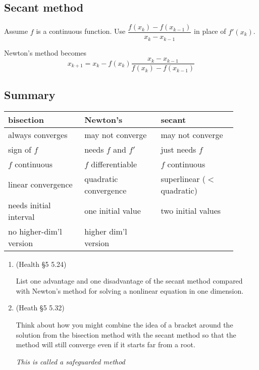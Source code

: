 \documentclass[12pt,letterpaper,noanswers]{exam}
\begin{document}
\subsection*{Secant method}
\begin{tcolorbox}
Assume $f$ is a continuous function.  Use $\dfrac{f(x_k)-f(x_{k-1})}{x_k-x_{k-1}}$ in place of $f'(x_{k})$.  

Newton's method becomes \[x_{k+1} = x_k - f(x_k)\dfrac{x_k-x_{k-1}}{f(x_k) - f(x_{k-1})}\]
\end{tcolorbox}

\subsection*{Summary}
\begin{tabular}{p{0.3\linewidth} p{0.3\linewidth} p{0.3\linewidth}}
bisection & Newton's & secant \\
\hline
always converges & may not converge & may not converge\\
sign of $f$  & needs $f$ and $f'$ & just needs $f$ \\
$f$ continuous & $f$ differentiable & $f$ continuous\\
linear convergence & quadratic convergence & superlinear ($<$ quadratic) \\
needs initial interval & one initial value& two initial values\\
no higher-dim'l version & higher dim'l version & \\
\end{tabular}

\begin{enumerate}[resume=classQ]
\item (Health \S5 5.24)

List one advantage and one disadvantage of the secant method compared with Newton's method for solving a nonlinear equation in one dimension.
\vspace{0.5in}

\item (Heath \S5 5.32) 

Think about how you might combine the idea of  a bracket around the solution from the bisection method with the secant method so that the method will still converge even if it starts far from a root.

\emph{This is called a safeguarded method}

\vspace{0.5in}
\end{enumerate}
\end{document}
